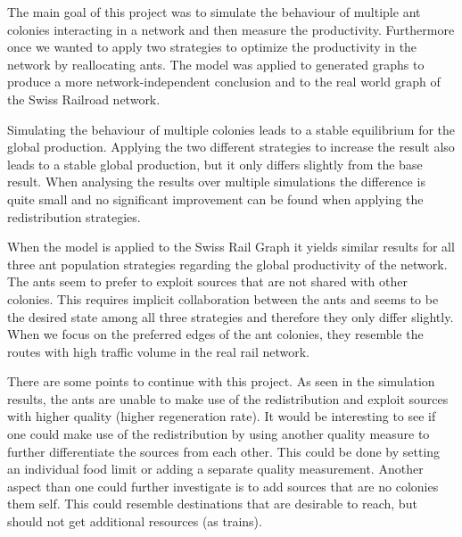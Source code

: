 The main goal of this project was to simulate the behaviour of multiple ant colonies interacting in a network and then measure the productivity. Furthermore once we wanted to apply two strategies to optimize the productivity in the network by reallocating ants. The model was applied to generated graphs to produce a more network-independent conclusion and to the real world graph of the Swiss Railroad network.

Simulating the behaviour of multiple colonies leads to a stable equilibrium for the global production. Applying the two different strategies to increase the result also leads to a stable global production, but it only differs slightly from the base result. When analysing the results over multiple simulations the difference is quite small and no significant improvement can be found when applying the redistribution strategies.

When the model is applied to the Swiss Rail Graph it yields similar results for all three ant population strategies regarding the global productivity of the network. The ants seem to prefer to exploit sources that are not shared with other colonies. This requires implicit collaboration between the ants and seems to be the desired state among all three strategies and therefore they only differ slightly. When we focus on the preferred edges of the ant colonies, they resemble the routes with high traffic volume in the real rail network.

There are some points to continue with this project. As seen in the simulation results, the ants are unable to make use of the redistribution and exploit sources with higher quality (higher regeneration rate). It would be interesting to see if one could make use of the redistribution by using another quality measure to further differentiate the sources from each other. This could be done by setting an individual food limit or adding a separate quality measurement. Another aspect than one could further investigate is to add sources that are no colonies them self. This could resemble destinations that are desirable to reach, but should not get additional resources (as trains).